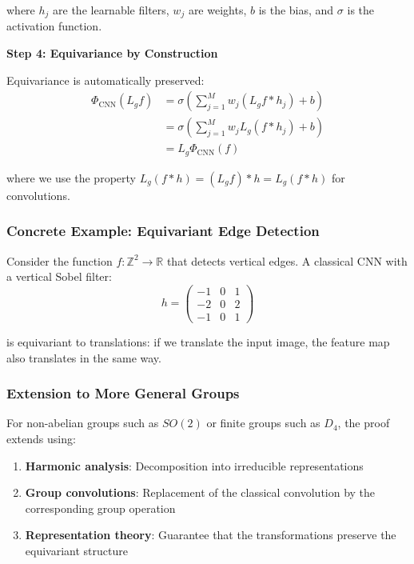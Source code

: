 where $h_j$ are the learnable filters, $w_j$ are weights, $b$ is the bias, and $\sigma$ is the activation function.

\textbf{Step 4: Equivariance by Construction}

Equivariance is automatically preserved:
\begin{align}
    \Phi_{\text{CNN}}(L_g f) &= \sigma\left(\sum_{j=1}^M w_j (L_g f * h_j) + b\right) \\
    &= \sigma\left(\sum_{j=1}^M w_j L_g(f * h_j) + b\right) \\
    &= L_g \Phi_{\text{CNN}}(f)
\end{align}

where we use the property $L_g(f * h) = (L_g f) * h = L_g(f * h)$ for convolutions.

\subsubsection{Concrete Example: Equivariant Edge Detection}

Consider the function $f: \mathbb{Z}^2 \to \mathbb{R}$ that detects vertical edges. A classical CNN with a vertical Sobel filter:
\begin{equation}
    h = \begin{pmatrix} -1 & 0 & 1 \\ -2 & 0 & 2 \\ -1 & 0 & 1 \end{pmatrix}
\end{equation}

is equivariant to translations: if we translate the input image, the feature map also translates in the same way.

\subsubsection{Extension to More General Groups}

For non-abelian groups such as $SO(2)$ or finite groups such as $D_4$, the proof extends using:

\begin{enumerate}
    \item \textbf{Harmonic analysis}: Decomposition into irreducible representations
    \item \textbf{Group convolutions}: Replacement of the classical convolution by the corresponding group operation
    \item \textbf{Representation theory}: Guarantee that the transformations preserve the equivariant structure
\end{enumerate}

